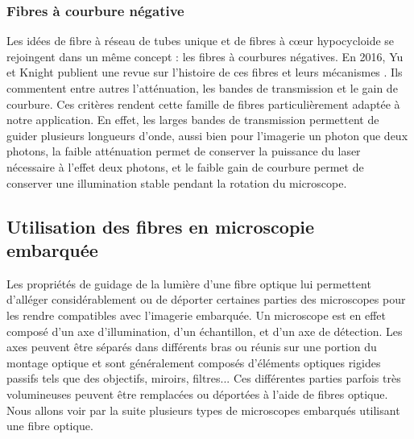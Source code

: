 \subsubsection{Fibres à courbure négative}

Les idées de fibre à réseau de tubes unique et de fibres à cœur hypocycloide se rejoingent dans un même concept : les fibres à courbures négatives. En 2016, Yu et Knight publient une revue sur l'histoire de ces fibres et leurs mécanismes \cite{yu_negative_2016}. Ils commentent entre autres l'atténuation, les bandes de transmission et le gain de courbure. Ces critères rendent cette famille de fibres particulièrement adaptée à notre application. En effet, les larges bandes de transmission permettent de guider plusieurs longueurs d'onde, aussi bien pour l'imagerie un photon que deux photons, la faible atténuation permet de conserver la puissance du laser nécessaire à l'effet deux photons, et le faible gain de courbure permet de conserver une illumination stable pendant la rotation du microscope.




\subsection{Utilisation des fibres en microscopie embarquée}


Les propriétés de guidage de la lumière d'une fibre optique lui permettent d'alléger considérablement ou de déporter certaines parties des microscopes pour les rendre compatibles avec l'imagerie embarquée. Un microscope est en effet composé d'un axe d'illumination, d'un échantillon, et d'un axe de détection. Les axes peuvent être séparés dans différents bras ou réunis sur une portion du montage optique et sont généralement composés d'éléments optiques rigides passifs tels que des objectifs, miroirs, filtres... Ces différentes parties parfois très volumineuses peuvent être remplacées ou déportées à l'aide de fibres optique. Nous allons voir par la suite plusieurs types de microscopes embarqués utilisant une fibre optique.

